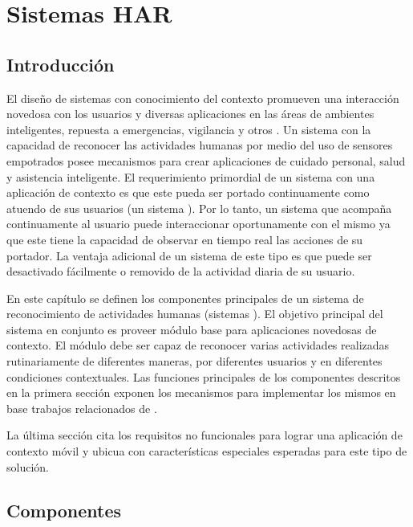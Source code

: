 
\chapter{Sistemas HAR }

\label{chap4:sistemas-de-reconocimiento}

\section{Introducción}

\label{sec41:introduccion}El diseño de sistemas con conocimiento
del contexto promueven una interacción novedosa con los usuarios y
diversas aplicaciones en las áreas de ambientes inteligentes, repuesta
a emergencias, vigilancia y otros \cite{Choudhury2008}. Un sistema
con la capacidad de reconocer las actividades humanas por medio del
uso de sensores empotrados posee mecanismos para crear aplicaciones
de cuidado personal, salud y asistencia inteligente. El requerimiento
primordial de un sistema con una aplicación de contexto es que este
pueda ser portado continuamente como atuendo de sus usuarios (un sistema
). Por lo tanto, un sistema que acompaña continuamente
al usuario puede interaccionar oportunamente con el mismo ya que este
tiene la capacidad de observar en tiempo real las acciones de su portador.
La ventaja adicional de un sistema de este tipo es que puede ser desactivado
fácilmente o removido de la actividad diaria de su usuario.

En este capítulo se definen los componentes principales de un sistema
de reconocimiento de actividades humanas (sistemas ). El
objetivo principal del sistema  en conjunto es proveer
módulo base para aplicaciones novedosas de contexto. El módulo debe
ser capaz de reconocer varias actividades realizadas rutinariamente
de diferentes maneras, por diferentes usuarios y en diferentes condiciones
contextuales. Las funciones principales de los componentes descritos
en la primera sección exponen los mecanismos para implementar los
mismos en base trabajos relacionados de  \cite{Choudhury2008,ReyesOrtiz2015}. 

La última sección cita los requisitos no funcionales para lograr una
aplicación de contexto móvil y ubicua con características especiales
esperadas para este tipo de solución.

\section{Componentes}

